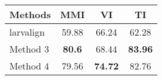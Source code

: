 \begin{tabular}{lccc}
\hline
 ﻿Methods  & MMI   & VI    & TI    \\ \hline \hline
 larvalign & 59.88 & 66.24 & 62.28 \\
 Method 3  & \textbf{80.6}  & 68.44 & \textbf{83.96} \\
 Method 4  & 79.56 & \textbf{74.72} & 82.76 \\
\hline
\end{tabular}